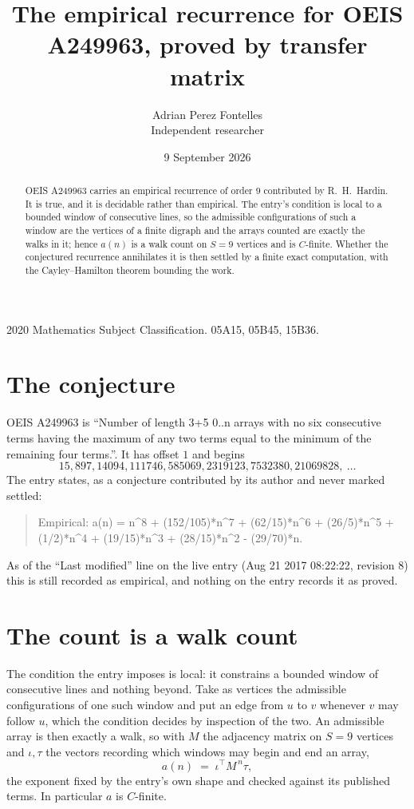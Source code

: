 \documentclass[11pt,a4paper]{article}
\title{The empirical recurrence for OEIS A249963, proved by transfer matrix}
\author{Adrian Perez Fontelles\\ \small Independent researcher}
\date{9 September 2026}
\theoremstyle{plain}
\theoremstyle{definition}
\begin{document}
\maketitle

\begin{abstract}
OEIS A249963 carries an empirical recurrence of order $9$ contributed by R.~H.~Hardin. It is
true, and it is decidable rather than empirical. The entry's condition is local to a bounded window of consecutive lines, so
the admissible configurations of such a window are the vertices of a finite digraph and the
arrays counted are exactly the walks in it; hence $a(n)$ is a walk count on $S=9$ vertices
and is $C$-finite. Whether the conjectured recurrence annihilates it is then settled by a
finite exact computation, with the Cayley--Hamilton theorem bounding the work.
\end{abstract}

\noindent\small 2020 Mathematics Subject Classification. 05A15, 05B45, 15B36.\normalsize

\section{The conjecture}

OEIS A249963 is ``Number of length 3+5 0..n arrays with no six consecutive terms having the maximum of any two terms equal to the minimum of the remaining four terms.''. It has offset $1$ and begins
\[
15, 897, 14094, 111746, 585069, 2319123, 7532380, 21069828,\ \dots
\]
The entry states, as a conjecture contributed by its author and never marked settled:
\begin{quote}
Empirical: a(n) = n\^{}8 + (152/105)*n\^{}7 + (62/15)*n\^{}6 + (26/5)*n\^{}5 + (1/2)*n\^{}4 + (19/15)*n\^{}3 + (28/15)*n\^{}2 - (29/70)*n.
\end{quote}
As of the ``Last modified'' line on the live entry (Aug 21 2017 08:22:22, revision 8) this is still
recorded as empirical, and nothing on the entry records it as proved.

\section{The count is a walk count}

The condition the entry imposes is local: it constrains a bounded window of consecutive lines and nothing beyond. Take as
vertices the admissible configurations of one such window and put an edge from $u$ to $v$
whenever $v$ may follow $u$, which the condition decides by inspection of the two. An
admissible array is then exactly a walk, so with $M$ the adjacency matrix on $S=9$ vertices
and $\iota,\tau$ the vectors recording which windows may begin and end an array,
\[
a(n)\;=\;\iota^{\!\top}M^{\,n}\tau ,
\]
the exponent fixed by the entry's own shape and checked against its published terms. In
particular $a$ is $C$-finite.
\end{document}
